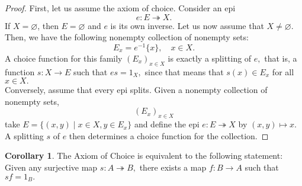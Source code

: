 \documentclass[11pt,leqno,landscape,semhelv]{seminar}
\numberwithin{equation}{section}
\theoremstyle{definition}
\newtheorem{cor}[thm]{Corollary}
\numberwithin{thm}{section}
\numberwithin{equation}{section}
\newcommand{\epi}{\twoheadrightarrow}
\let\emptyset\varnothing
\begin{document}
\begin{proof} 
	First, let us assume the axiom of choice. Consider an epi
	\begin{equation*} 
		e : E \epi X.
	\end{equation*}
	If $X = \emptyset$, then $E = \emptyset$ and $e$ is its own inverse. Let us now assume that $X \neq \emptyset.$\\
	Then, we have the following nonempty collection of nonempty sets:
	\begin{equation*} 
		E_x = e^{-1}\{x\}, \quad x \in X.
	\end{equation*}
	A choice function for this family $(E_x)_{x \in X}$ is exactly a splitting of $e,$ that is, a function $s:X \to E$ such that $es = 1_X,$ since that means that $s(x) \in E_x$ for all $x \in X.$\\
	Conversely, assume that every epi splits. Given a nonempty collection of nonempty sets,
	\begin{equation*} 
		(E_x)_{x\in X}
	\end{equation*}
	take $E = \{(x, y) \mid x \in X, y \in E_x\}$ and define the epi $e:E\epi X$ by $(x, y) \mapsto x.$ A splitting $s$ of $e$ then determines a choice function for the collection.
\end{proof}
\begin{cor}
	The Axiom of Choice is equivalent to the following statement:\\
	Given any surjective map $s:A \epi B,$ there exists a map $f:B\to A$ such that $sf = 1_B.$
\end{cor}
\end{document}
